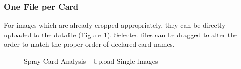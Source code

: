 \documentclass[10pt,letterpaper,titlepage]{article}
\begin{document}
    \subsubsection{One File per Card}
    For images which are already cropped appropriately, they can be directly uploaded to the datafile (Figure~\ref{fig:card_upload_singles}). Selected files can be dragged to alter the order to match the proper order of declared card names.
    \begin{figure}[hb]
        \centering
        \caption{Spray-Card Analysis - Upload Single Images}
        \label{fig:card_upload_singles}
    \end{figure}
    \FloatBarrier
\end{document}
